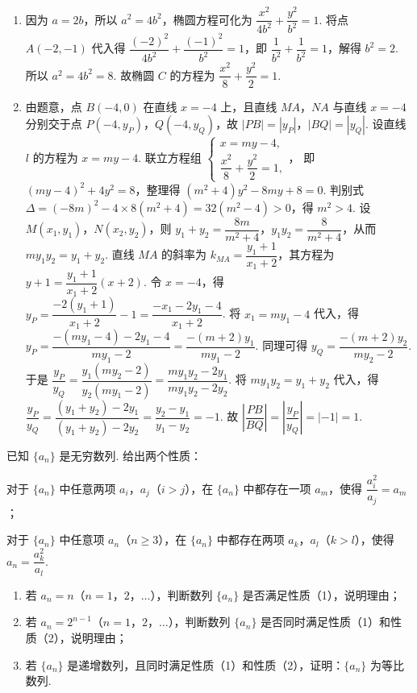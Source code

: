\begin{solution}
\begin{enumerate}
    \item 因为 \(a=2b\)，所以 \(a^2=4b^2\)，椭圆方程可化为 \(\dfrac{x^2}{4b^2}+\dfrac{y^2}{b^2}=1\). 将点 \(A(-2,-1)\) 代入得 \(\dfrac{(-2)^2}{4b^2}+\dfrac{(-1)^2}{b^2}=1\)，即 \(\dfrac{1}{b^2}+\dfrac{1}{b^2}=1\)，解得 \(b^2=2\). 所以 \(a^2=4b^2=8\). 故椭圆 \(C\) 的方程为 \(\dfrac{x^2}{8}+\dfrac{y^2}{2}=1\).
    \item 由题意，点 \(B(-4,0)\) 在直线 \(x=-4\) 上，且直线 \(MA\)，\(NA\) 与直线 \(x=-4\) 分别交于点 \(P(-4,y_P)\)，\(Q(-4,y_Q)\)，故 \(|PB|=|y_P|\)，\(|BQ|=|y_Q|\). 设直线 \(l\) 的方程为 \(x=my-4\). 联立方程组
    \(\begin{cases}
    x=my-4,\\
    \dfrac{x^2}{8}+\dfrac{y^2}{2}=1,
    \end{cases}\)，
    即 \((my-4)^2+4y^2=8\)，整理得 \((m^2+4)y^2-8my+8=0\). 判别式 \(\Delta=(-8m)^2-4\times8(m^2+4)=32(m^2-4)>0\)，得 \(m^2>4\). 设 \(M(x_1,y_1)\)，\(N(x_2,y_2)\)，则 \(y_1+y_2=\dfrac{8m}{m^2+4}\)，\(y_1y_2=\dfrac{8}{m^2+4}\)，从而 \(my_1y_2=y_1+y_2\). 直线 \(MA\) 的斜率为 \(k_{MA}=\dfrac{y_1+1}{x_1+2}\)，其方程为 \(y+1=\dfrac{y_1+1}{x_1+2}(x+2)\). 令 \(x=-4\)，得 \(y_P=\dfrac{-2(y_1+1)}{x_1+2}-1=\dfrac{-x_1-2y_1-4}{x_1+2}\). 将 \(x_1=my_1-4\) 代入，得 \(y_P=\dfrac{-(my_1-4)-2y_1-4}{my_1-2}=\dfrac{-(m+2)y_1}{my_1-2}\). 同理可得 \(y_Q=\dfrac{-(m+2)y_2}{my_2-2}\). 于是 \(\dfrac{y_P}{y_Q}=\dfrac{y_1(my_2-2)}{y_2(my_1-2)}=\dfrac{my_1y_2-2y_1}{my_1y_2-2y_2}\). 将 \(my_1y_2=y_1+y_2\) 代入，得 \(\dfrac{y_P}{y_Q}=\dfrac{(y_1+y_2)-2y_1}{(y_1+y_2)-2y_2}=\dfrac{y_2-y_1}{y_1-y_2}=-1\). 故 \(\left|\dfrac{PB}{BQ}\right|=\left|\dfrac{y_P}{y_Q}\right|=|-1|=1\).
\end{enumerate}
\end{solution}

\begin{problem}
已知 \(\{a_n\}\) 是无穷数列. 给出两个性质：

\begin{circlelist}
\item 对于 \(\{a_n\}\) 中任意两项 \(a_i\)，\(a_j\)（\(i>j\)），在 \(\{a_n\}\) 中都存在一项 \(a_m\)，使得 \(\dfrac{a_i^2}{a_j}=a_m\)；

\item 对于 \(\{a_n\}\) 中任意项 \(a_n\)（\(n\ge3\)），在 \(\{a_n\}\) 中都存在两项 \(a_k\)，\(a_l\)（\(k>l\)），使得 \(a_n=\dfrac{a_k^2}{a_l}\).
\end{circlelist}

\begin{enumerate}
\item 若 \(a_n=n\)（\(n=1\)，\(2\)，\(\dots\)），判断数列 \(\{a_n\}\) 是否满足性质（1），说明理由；
\item 若 \(a_n=2^{n-1}\)（\(n=1\)，\(2\)，\(\dots\)），判断数列 \(\{a_n\}\) 是否同时满足性质（1）和性质（2），说明理由；
\item 若 \(\{a_n\}\) 是递增数列，且同时满足性质（1）和性质（2），证明：\(\{a_n\}\) 为等比数列.
\end{enumerate}
\end{problem}

